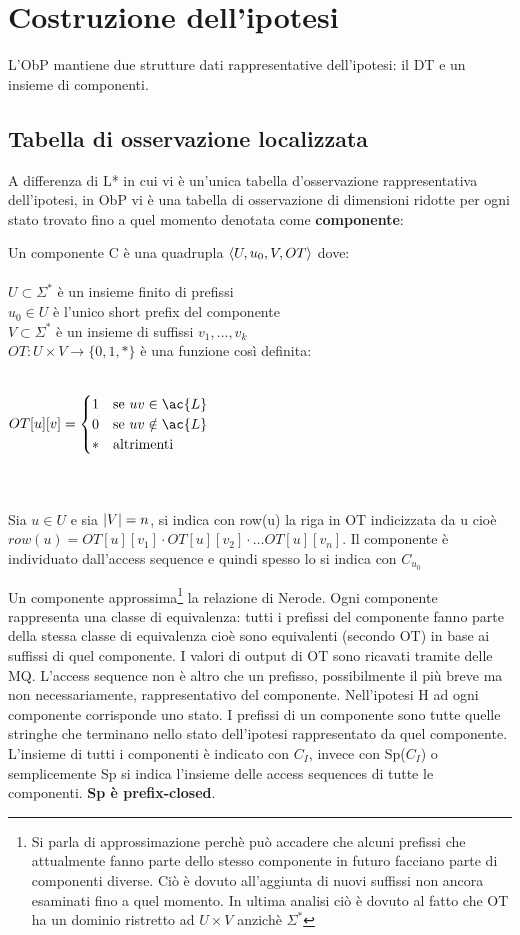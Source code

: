 \section{Costruzione dell'ipotesi}
L'\ac{ObP} mantiene due strutture dati rappresentative dell'ipotesi: il \ac{DT} e un insieme di componenti.
\subsection{Tabella di osservazione localizzata}
A differenza di L* in cui vi è un'unica tabella d'osservazione rappresentativa dell'ipotesi, in \ac{ObP} vi è una tabella di osservazione di dimensioni ridotte per ogni stato trovato fino a quel momento denotata come \textbf{componente}:
\begin{definizione*}[Componente] \label{def:obstable}Un componente C è una quadrupla $\Braket{U,u_0,V,OT}$ dove:\\\\
$U \subset \Sigma^{*}$ è un insieme finito di prefissi\\
$u_0 \in U$ è l'unico short prefix del componente\\
$V \subset \Sigma^{*}$ è un insieme di suffissi  $v_1,\dots,v_k$\\
$OT : U \times V \to \{0,1,*\}$ è una funzione così definita:\\\\
\centerline{$
OT[u][v] = 
\begin{cases}
1
& \text{se $uv \in \ac{L}$} \\
0 & \text{se $uv \notin \ac{L}$}\\
* & \text{altrimenti}
\end{cases}
$}   \\\\
Sia $u \in U$ e sia $\lvert V\rvert = n$, si indica con row(u) la riga in OT indicizzata da u cioè $row(u)=OT[u][v_1] \cdot OT[u][v_2] \cdot \dots OT[u][v_n]$. Il componente è individuato dall'access sequence e quindi spesso lo si indica con $C_{u_{0}}$   
\end{definizione*}
Un componente approssima\footnote{Si parla di approssimazione perchè può accadere che alcuni prefissi che attualmente fanno parte dello stesso componente in futuro facciano parte di componenti diverse. Ciò è dovuto all'aggiunta di nuovi suffissi non ancora esaminati fino a quel momento. In ultima analisi ciò è dovuto al fatto che OT ha un dominio ristretto ad $U\times{}V$ anzichè $\Sigma^{*}$} la relazione di Nerode. Ogni componente rappresenta una classe di equivalenza: tutti i prefissi del componente fanno parte della stessa classe di equivalenza cioè   sono equivalenti (secondo OT) in base ai suffissi di quel componente. I valori di output di OT sono ricavati tramite delle \ac{MQ}. L'access sequence non è altro che un prefisso, possibilmente il più breve ma non necessariamente, rappresentativo del componente. Nell'ipotesi \ac{H} ad ogni componente  corrisponde uno stato. I prefissi di un componente sono tutte quelle stringhe che terminano nello stato dell'ipotesi rappresentato da quel componente. L'insieme di tutti i componenti è indicato con $C_I$, invece con Sp($C_I$) o semplicemente Sp si indica l'insieme delle access sequences di tutte le componenti. \textbf{Sp è prefix-closed}.

